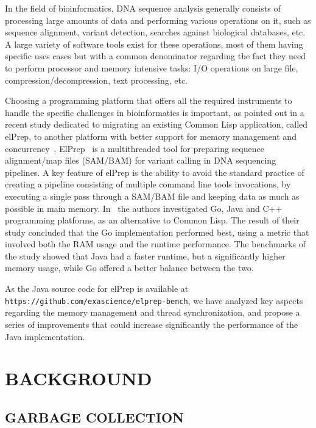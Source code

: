 \documentclass[a4paper,twoside]{article}
\begin{document}
In the field of bioinformatics, DNA sequence analysis generally consists of processing large amounts of data and performing
various operations on it,
such as sequence alignment, variant detection, searches against biological databases, etc.
A large variety of software tools exist for these operations, most of them having specific uses cases but with a common
denominator regarding the fact they need to perform processor and memory intensive tasks: I/O operations on large file,
compression/decompression, text processing, etc.

Choosing a programming platform that offers all the required instruments to handle the specific challenges in
bioinformatics is important,
as pointed out in a recent study dedicated to migrating an existing Common Lisp application, called elPrep, 
to another platform with better support for memory management and concurrency~\cite{costanza:2019}.
ElPrep~\cite{herzeel:2019} is a multithreaded tool for preparing sequence alignment/map files (SAM/BAM)
for variant calling in DNA sequencing pipelines. 
A key feature of elPrep is the ability to avoid the standard practice of creating a pipeline consisting of multiple
command line tools invocations,
by executing a single pass through a SAM/BAM file and keeping data as much as possible in main memory.
In~\cite{costanza:2019} the authors investigated Go, Java and C++ programming platforms, as an alternative to Common Lisp.
The result of their study concluded that the Go implementation performed best, using a metric that involved both the
RAM usage and the runtime performance.
The benchmarks of the study showed that Java had a faster runtime, but a significantly higher memory usage, while Go
offered a better balance between the two.

As the Java source code for elPrep is available at {\texttt{https://github.com/exascience/elprep-bench}}, we have
analyzed key aspects regarding the memory management and thread synchronization, and propose a series of improvements
that could increase significantly the performance of the Java implementation.


\section{\uppercase{Background}}
\label{background}

\subsection{\uppercase{Garbage Collection}}
\label{background:gc}
\end{document}

